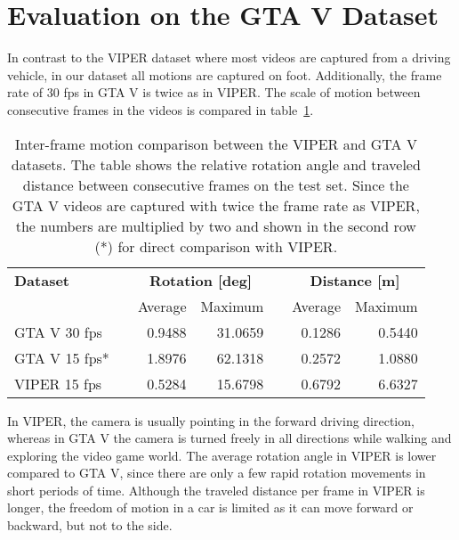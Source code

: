 	\section{Evaluation on the GTA V Dataset}
		In contrast to the VIPER dataset where most videos are captured from a driving vehicle, in our dataset all motions are captured on foot.
		Additionally, the frame rate of 30 fps in GTA V is twice as in VIPER.
		The scale of motion between consecutive frames in the videos is compared in table~\ref{tbl:viper-gta-comparison-inter-frame-motion}.	
		\begin{table}[tb]
			\small
			\begin{center}
				\begin{tabular}{lcrrcrr}
					\toprule
					\textbf{Dataset} 		& 	& \multicolumn{2}{c}{\textbf{Rotation [deg]}} 		& & \multicolumn{2}{c}{\textbf{Distance [m]}} 		\\
									& 	& Average 		& Maximum			&	& Average 		& Maximum					\\
					\midrule
					GTA V 30 fps 	& 	&  0.9488	& 31.0659 		&	& 0.1286 	& 0.5440 				\\
					GTA V 15 fps*	& 	&  1.8976	& 62.1318		& 	& 0.2572	& 1.0880				\\
					VIPER 15 fps	&   & 0.5284	& 15.6798 		& 	& 0.6792	& 6.6327				\\
					\bottomrule
				\end{tabular}
			\end{center}
			\caption[Inter-frame motion comparison between the VIPER and GTA V datasets]
					{Inter-frame motion comparison between the VIPER and GTA V datasets.
					 The table shows the relative rotation angle and traveled distance between consecutive frames on the test set.
					 Since the GTA V videos are captured with twice the frame rate as VIPER, the numbers are multiplied by two and shown in the second row (*) for direct comparison with VIPER. 
					 \label{tbl:viper-gta-comparison-inter-frame-motion}}
			
		\end{table}
		In VIPER, the camera is usually pointing in the forward driving direction, whereas in GTA V the camera is turned freely in all directions while walking and exploring the video game world.
		The average rotation angle in VIPER is lower compared to GTA V, since there are only a few rapid rotation movements in short periods of time.
		Although the traveled distance per frame in VIPER is longer, the freedom of motion in a car is limited as it can move forward or backward, but not to the side.
		
